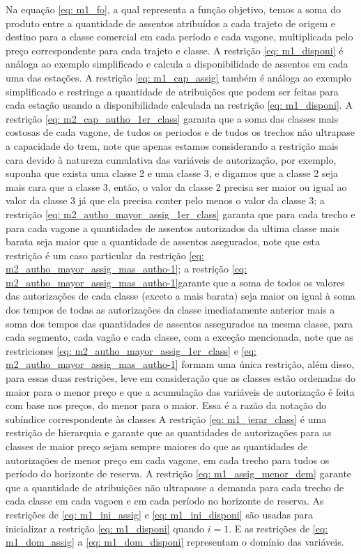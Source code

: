 Na equação \ref{eq: m1_fo}, a qual representa a função objetivo, temos a soma do produto entre a quantidade de assentos atribuídos a cada trajeto de origem e destino para a classe comercial em cada período e cada vagone, multiplicada pelo preço correspondente para cada trajeto e classe. A restrição \ref{eq: m1_disponi} é análoga ao exemplo simplificado e calcula a disponibilidade de assentos em cada uma das estações. A restrição \ref{eq: m1_cap_assig} também é análoga ao exemplo simplificado e restringe a quantidade de atribuições que podem ser feitas para cada estação usando a disponibilidade calculada na restrição \ref{eq: m1_disponi}.
A restrição \ref{eq: m2_cap_autho_1er_class} garanta que a soma das classes mais costosas de cada vagone, de tudos os periodos e de tudos os trechos não ultrapase a capacidade do trem, note que apenas estamos considerando a restrição mais cara devido à natureza cumulativa das variáveis de autorização, por exemplo, suponha que exista uma classe 2 e uma classe 3, e digamos que a classe 2 seja mais cara que a classe 3, então, o valor da classe 2 precisa ser maior ou igual ao valor da classe 3 já que ela precisa conter pelo menos o valor da classe 3; a restrição \ref{eq: m2_autho_mayor_assig_1er_class} garanta que para cada trecho e para cada vagone a quantidades de assentos autorizados da ultima classe mais barata seja maior que a quantidade de assentos asegurados, note que esta restrição é um caso particular da restrição \ref{eq: m2_autho_mayor_assig_mas_autho-1}; a restrição \ref{eq: m2_autho_mayor_assig_mas_autho-1}garante que a soma de todos os valores das autorizações de cada classe (exceto a mais barata) seja maior ou igual à soma dos tempos de todas as autorizações da classe imediatamente anterior mais a soma dos tempos das quantidades de assentos assegurados na mesma classe, para cada segmento, cada vagão e cada classe, com a exceção mencionada, note que as restriciones \ref{eq: m2_autho_mayor_assig_1er_class} e \ref{eq: m2_autho_mayor_assig_mas_autho-1} formam uma única restrição, além disso, para essas duas restrições, leve em consideração que as classes estão ordenadas do maior para o menor preço e que a acumulação das variáveis de autorização é feita com base nos preços, do menor para o maior. Essa é a razão da notação do subíndice correspondente às classes
A restrição \ref{eq: m1_jerar_class} é uma restrição de hierarquia e garante que as quantidades de autorizações para as classes de maior preço sejam sempre maiores do que as quantidades de autorizações de menor preço em cada vagone, em cada trecho para tudos os período do horizonte de reserva. 
A restrição \ref{eq: m1_assig_menor_dem} garante que a quantidade de atribuições não ultrapasse a demanda para cada trecho de cada classe em cada vagoen e em cada período no horizonte de reserva.
As restrições de \ref{eq: m1_ini_assig} e \ref{eq: m1_ini_disponi} são usadas para inicializar a restrição \ref{eq: m1_disponi} quando \(i = 1\). E as restrições de \ref{eq: m1_dom_assig} a \ref{eq: m1_dom_disponi} representam o domínio das variáveis.

